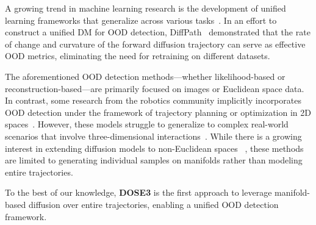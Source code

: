 A growing trend in machine learning research is the development of unified learning frameworks that generalize across various tasks~\citep{xiao2021reallyneedlearnrepresentations}. In an effort to construct a unified DM for \ac{OOD} detection, DiffPath~\citep{heng2024out} demonstrated that the rate of change and curvature of the forward diffusion trajectory can serve as effective \ac{OOD} metrics, eliminating the need for retraining on different datasets. 

The aforementioned \ac{OOD} detection methods—whether likelihood-based or reconstruction-based—are primarily focused on images or Euclidean space data. In contrast, some research from the robotics community implicitly incorporates \ac{OOD} detection under the framework of trajectory planning or optimization in 2D spaces~\citep{PDMP, 5354448, 5509799}. However, these models struggle to generalize to complex real-world scenarios that involve three-dimensional interactions~\citep{wang2023efficienttrajectorygenerationground, 10.1016/j.vehcom.2024.100733}. While there is a growing interest in extending diffusion models to non-Euclidean spaces ~\citep{huang2022riemannian, leach2022denoising}, these methods are limited to generating individual samples on manifolds rather than modeling entire trajectories. 

To the best of our knowledge, \textbf{DOSE3} is the first approach to leverage manifold-based diffusion over entire trajectories, enabling a unified \ac{OOD} detection framework.